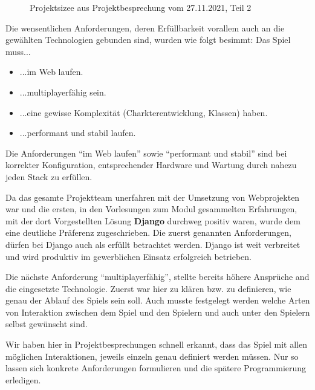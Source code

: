 \begin{figure}[H]
    \centering
    \caption{Projektsizee aus Projektbesprechung vom 27.11.2021, Teil 2}
    \label{fig:2021-11-27-projektskizze-2}
\end{figure}

Die wensentlichen Anforderungen, deren Erfüllbarkeit vorallem auch an die gewählten Technologien gebunden sind, wurden wie folgt besimmt: Das Spiel muss... \begin{itemize}
    \item ...im Web laufen.
    \item ...multiplayerfähig sein.
    \item ...eine gewisse Komplexität (Charkterentwicklung, Klassen) haben.
    \item ...performant und stabil laufen.
\end{itemize}


Die Anforderungen \enquote{im Web laufen} sowie \enquote{performant und stabil} sind bei korrekter Konfiguration, entsprechender Hardware und Wartung durch nahezu jeden \ac{Stack} zu erfüllen. 

Da das gesamte Projektteam unerfahren mit der Umsetzung von Webprojekten war und die ersten, in den Vorlesungen zum Modul gesammelten Erfahrungen, mit der dort Vorgestellten Lösung \textbf{Django} durchweg positiv waren, wurde dem eine deutliche Präferenz zugeschrieben. Die zuerst genannten Anforderungen, dürfen bei Django auch als erfüllt betrachtet werden. Django ist weit verbreitet und wird produktiv im gewerblichen Einsatz erfolgreich betrieben. 

Die nächste Anforderung \enquote{multiplayerfähig}, stellte bereits höhere Ansprüche and die eingesetzte Technologie. Zuerst war hier zu klären bzw. zu definieren, wie genau der Ablauf des Spiels sein soll. Auch musste festgelegt werden welche Arten von Interaktion zwischen dem Spiel und den Spielern und auch unter den Spielern selbst gewünscht sind. 

Wir haben hier in Projektbesprechungen schnell erkannt, dass das Spiel mit allen möglichen Interaktionen, jeweils einzeln genau definiert werden müssen. Nur so lassen sich konkrete Anforderungen formulieren und die spätere Programmierung erledigen. 


